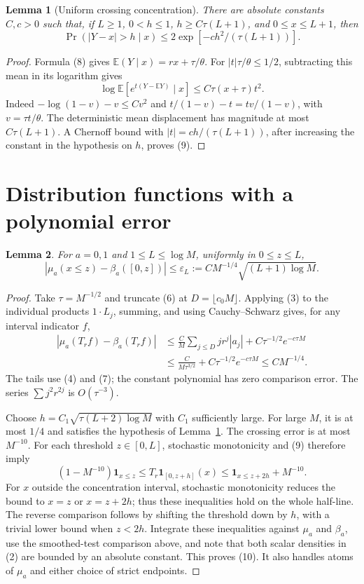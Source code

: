 \documentclass[11pt]{article}
\newtheorem{lemma}{Lemma}
\newcommand{\E}{\mathbb E}
\begin{document}
\begin{lemma}[Uniform crossing concentration]\label{concentration}
There are absolute constants $C,c>0$ such that, if $L\ge1$,
$0<h\le1$, $h\ge C\tau(L+1)$, and $0\le x\le L+1$, then
\[
 \Pr(|Y-x|>h\mid x)\le2\exp[-c h^2/(\tau(L+1))].
 \tag{9}
\]
\end{lemma}
\begin{proof}
Formula (8) gives $\E(Y\mid x)=rx+\tau/\theta$. For
$|t|\tau/\theta\le1/2$, subtracting this mean in its logarithm gives
\[
 \log\E[e^{t(Y-\E Y)}\mid x]
 \le C\tau(x+\tau)t^2.
\]
Indeed $-\log(1-v)-v\le C v^2$ and
$t/(1-v)-t=tv/(1-v)$, with $v=\tau t/\theta$.
The deterministic mean displacement has magnitude at most
$C\tau(L+1)$. A Chernoff bound with
$|t|=c h/(\tau(L+1))$, after increasing the constant in the
hypothesis on $h$, proves (9).
\end{proof}

\section*{Distribution functions with a polynomial error}
\begin{lemma}\label{cdf}
For $a=0,1$ and $1\le L\le\log M$, uniformly in $0\le z\le L$,
\[
 |\mu_a(x\le z)-\beta_a([0,z])|
 \le \varepsilon_L:=C M^{-1/4}\sqrt{(L+1)\log M}.
 \tag{10}
\]
\end{lemma}
\begin{proof}
Take $\tau=M^{-1/2}$ and truncate (6) at
$D=\lfloor c_0M\rfloor$. Applying (3) to the individual products
$1\cdot L_j$, summing, and using Cauchy--Schwarz gives, for any
interval indicator $f$,
\begin{align*}
 |\mu_a(T_rf)-\beta_a(T_rf)|
 &\le\frac C M\sum_{j\le D}j r^j|a_j|
       +C\tau^{-1/2}e^{-c\tau M}\\
 &\le\frac C{M\tau^{3/2}}
       +C\tau^{-1/2}e^{-c\tau M}
 \le C M^{-1/4}.
\end{align*}
The tails use (4) and (7); the constant polynomial has zero
comparison error. The series $\sum j^2r^{2j}$ is $O(\tau^{-3})$.

Choose $h=C_1\sqrt{\tau(L+2)\log M}$ with $C_1$ sufficiently large.
For large $M$, it is at most $1/4$ and satisfies the hypothesis of
Lemma~\ref{concentration}. The crossing error is at most $M^{-10}$.
For each threshold $z\in[0,L]$, stochastic monotonicity and (9)
therefore imply
\[
 (1-M^{-10})\boldsymbol1_{x\le z}
 \le T_r\boldsymbol1_{[0,z+h]}(x)
 \le\boldsymbol1_{x\le z+2h}+M^{-10}.
\]
For $x$ outside the concentration interval, stochastic monotonicity
reduces the bound to $x=z$ or $x=z+2h$; thus these inequalities hold
on the whole half-line. The reverse comparison follows by shifting
the threshold down by $h$, with a trivial lower bound when $z<2h$.
Integrate these inequalities against $\mu_a$ and $\beta_a$, use the
smoothed-test comparison above, and note that both scalar densities
in (2) are bounded by an absolute constant. This proves (10).
It also handles atoms of $\mu_a$ and either choice of strict endpoints.
\end{proof}
\end{document}
